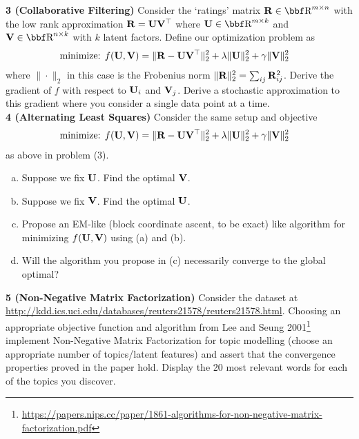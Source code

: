\documentclass[12pt,letterpaper,fleqn]{hmcpset}
\begin{document}
\textbf{3 (Collaborative Filtering)} Consider the `ratings' matrix $\Rb\in\RR^{m\times n}$
with the low rank approximation ${\bf R} = {\bf U} {\bf V}^\top$ where $\Ub\in\RR^{m\times k}$ and $\Vb\in\RR^{n\times k}$
with $k$ latent factors. Define our optimization problem as
\begin{align*}
    \text{minimize: } & f({\bf U},{\bf V}) = \|{\bf R} - {\bf U}{\bf V}^\top\|_2^2 + \lambda\|{\bf U}\|_2^2 + \gamma\|{\bf V}\|_2^2
\end{align*}
where $\|\cdot\|_2$ in this case is the Frobenius norm $\|{\bf R}\|_2^2 = \sum_{ij}{\bf R}_{ij}^2$.
Derive the gradient of $f$ with respect to ${\bf U}_i$ and ${\bf V}_j$. Derive a stochastic
approximation to this gradient where you consider a single data point at a time.\\

\textbf{4 (Alternating Least Squares)} Consider the same setup and objective
\begin{align*}
    \text{minimize: } & f({\bf U},{\bf V}) = \|{\bf R} - {\bf U}{\bf V}^\top\|_2^2 + \lambda\|{\bf U}\|_2^2 + \gamma\|{\bf V}\|_2^2
\end{align*}
as above in problem (3).
\begin{enumerate}[(a)]
    \item Suppose we fix ${\bf U}$. Find the optimal ${\bf V}$.
    \item Suppose we fix ${\bf V}$. Find the optimal ${\bf U}$.
    \item Propose an EM-like (block coordinate ascent, to be exact) like algorithm
        for minimizing $f({\bf U},{\bf V})$ using (a) and (b).
    \item Will the algorithm you propose in (c) necessarily converge to the global
        optimal?
\end{enumerate}

\textbf{5 (Non-Negative Matrix Factorization)} Consider the dataset at
\url{http://kdd.ics.uci.edu/databases/reuters21578/reuters21578.html}. Choosing an appropriate
objective function and algorithm from Lee and Seung 2001\footnote{\url{https://papers.nips.cc/paper/1861-algorithms-for-non-negative-matrix-factorization.pdf}}
implement Non-Negative Matrix Factorization for topic modelling (choose an appropriate number
of topics/latent features) and assert that the convergence properties proved in the paper hold. 
Display the 20 most relevant words for each of the topics you discover.
\end{document}

